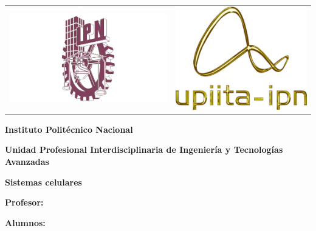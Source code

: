 \begin{titlepage}
    \noindent
    \begin{tabular}{@{} p{} p{} @{}}
        \includegraphics[width=0.8\linewidth]{./img/logo-ipn.png} &
        \hfill \includegraphics[width=0.6\linewidth]{./img/logo-upiita.png} \\
    \end{tabular}


    \centering
    \vspace*{1cm}
    {\huge \textbf{Instituto Politécnico Nacional} \par}
    {\LARGE \textbf{Unidad Profesional Interdisciplinaria de Ingeniería y Tecnologías Avanzadas} \par}
    \vspace{1.5cm}
    {\LARGE \textbf{Sistemas celulares} \par} %
    \vspace{1cm}
    {\Huge \titulo \par}            %
    \vspace{2cm}
    {\large \textbf{Profesor:} \profesor \par} %
    {\large \textbf{Alumnos:} \alumno \par}     %
    {\large \alumnodos}
    \vfill
    {\large \textbf{\grupo} \par}       %
    
    {\large \fecha \par}            %
\end{titlepage}